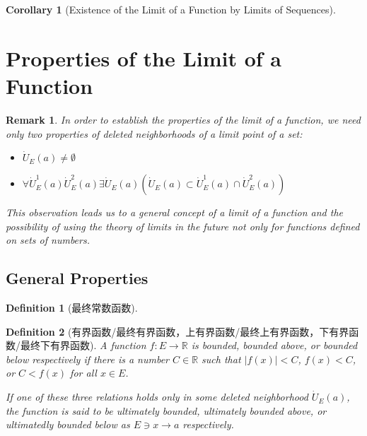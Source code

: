 \documentclass[onecolumn]{ctexart}
\newtheorem{definition}{Definition}
\newtheorem{corollary}{Corollary}
\newtheorem{remark}{Remark}
\begin{document}
\begin{corollary}[Existence of the Limit of a Function by Limits of Sequences]
  
\end{corollary}

\section{Properties of the Limit of a Function}

\begin{remark}
  In order to establish the properties of the limit of a function, we need only 
  two properties of deleted neighborhoods of a limit point of a set:
  \begin{itemize}
    \item $\dot{U}_E(a) \neq \emptyset$
    \item $\forall \dot{U}_E^1(a) \dot{U}_E^2(a) \exists \dot{U}_E(a) 
    (\dot{U}_E(a) \subset \dot{U}_E^1(a) \cap \dot{U}_E^2(a))$
  \end{itemize}
  This observation leads us to a general concept of a limit of a function and 
  the possibility of using the theory of limits in the future not only for 
  functions defined on sets of numbers.
\end{remark}

\subsection{General Properties}

\begin{definition}[最终常数函数]
  
\end{definition}

\begin{definition}[有界函数/最终有界函数，上有界函数/最终上有界函数，下有界函数/最终下有界函数]
  A function $f: E \to \mathbb{R}$ is bounded, bounded above, or bounded below 
  respectively if there is a number $C \in \mathbb{R}$ such that $|f(x)| < C$, 
  $f(x) < C$, or $C < f(x)$ for all $x \in E$.

  If one of these three relations holds only in some deleted neighborhood 
  $\dot{U}_E(a)$, the function is said to be ultimately bounded, ultimately 
  bounded above, or ultimatedly bounded below as $E \owns x \to a$ respectively.
\end{definition}
\end{document}
